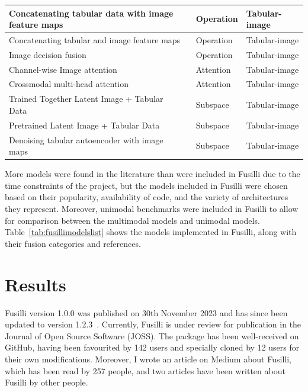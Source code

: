 \begin{table}[!ht]
\begin{tabular}{|p{8cm}ll|}
        Concatenating tabular data with image feature maps~\cite{liFusingMetadataDermoscopy2020}  & Operation & Tabular-image \\ \hline
        Concatenating tabular and image feature maps~\cite{gaoReducingUncertaintyCancer2022} & Operation & Tabular-image \\ \hline
        Image decision fusion & Operation & Tabular-image \\ \hline 
        Channel-wise Image attention~\cite{duanmuPredictionPathologicalComplete2020} & Attention & Tabular-image \\ \hline
        Crossmodal multi-head attention~\cite{golovanevskyMultimodalAttentionbasedDeep2022} & Attention & Tabular-image \\ \hline
        Trained Together Latent Image + Tabular Data~\cite{zhaoMultimodalDeepLearning2022} & Subspace & Tabular-image \\ \hline
        Pretrained Latent Image + Tabular Data~\cite{zhaoMultimodalDeepLearning2022} & Subspace & Tabular-image \\ \hline
        Denoising tabular autoencoder with image maps~\cite{yanRicherFusionNetwork2021} & Subspace & Tabular-image \\ \hline
    \end{tabular}
\end{table}

More models were found in the literature than were included in Fusilli due to the time constraints of the project, but the models included in Fusilli were chosen based on their popularity, availability of code, and the variety of architectures they represent.
Moreover, unimodal benchmarks were included in Fusilli to allow for comparison between the multimodal models and unimodal models.
Table~\ref{tab:fusillimodelslist} shows the models implemented in Fusilli, along with their fusion categories and references.



\section{Results}

Fusilli version 1.0.0 was published on 30th November 2023 and has since been updated to version 1.2.3~\cite{townendFlorencejtFusilliFusilli2024}.
Currently, Fusilli is under review for publication in the Journal of Open Source Software (JOSS).
The package has been well-received on GitHub, having been favourited by 142 users and specially cloned by 12 users for their own modifications.
Moreover, I wrote an article on Medium about Fusilli, which has been read by 257 people, and two articles have been written about Fusilli by other people.

